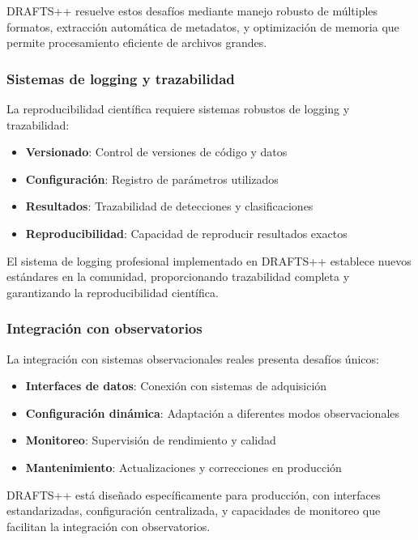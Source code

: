 DRAFTS++ resuelve estos desafíos mediante manejo robusto de múltiples formatos, extracción automática de metadatos, y optimización de memoria que permite procesamiento eficiente de archivos grandes.

\subsubsection{Sistemas de logging y trazabilidad}

La reproducibilidad científica requiere sistemas robustos de logging y trazabilidad:

\begin{itemize}
    \item \textbf{Versionado}: Control de versiones de código y datos
    \item \textbf{Configuración}: Registro de parámetros utilizados
    \item \textbf{Resultados}: Trazabilidad de detecciones y clasificaciones
    \item \textbf{Reproducibilidad}: Capacidad de reproducir resultados exactos
\end{itemize}

El sistema de logging profesional implementado en DRAFTS++ establece nuevos estándares en la comunidad, proporcionando trazabilidad completa y garantizando la reproducibilidad científica.

\subsubsection{Integración con observatorios}

La integración con sistemas observacionales reales presenta desafíos únicos:

\begin{itemize}
    \item \textbf{Interfaces de datos}: Conexión con sistemas de adquisición
    \item \textbf{Configuración dinámica}: Adaptación a diferentes modos observacionales
    \item \textbf{Monitoreo}: Supervisión de rendimiento y calidad
    \item \textbf{Mantenimiento}: Actualizaciones y correcciones en producción
\end{itemize}

DRAFTS++ está diseñado específicamente para producción, con interfaces estandarizadas, configuración centralizada, y capacidades de monitoreo que facilitan la integración con observatorios.

